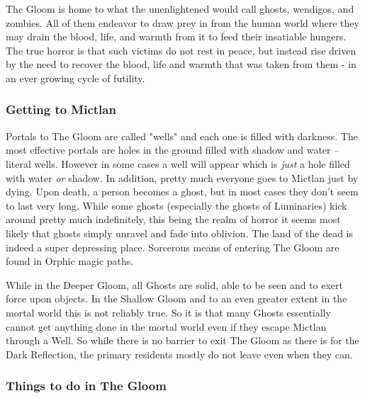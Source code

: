 The Gloom is home to what the unenlightened would call ghosts, wendigos, and zombies. All of them endeavor to draw prey in from the human world where they may drain the blood, life, and warmth from it to feed their insatiable hungers. The true horror is that such victims do not rest in peace, but instead rise driven by the need to recover the blood, life and warmth that was taken from them - in an ever growing cycle of futility. 

\subsubsection{Getting to Mictlan}

Portals to The Gloom are called "wells" and each one is filled with darkness. The most effective portals are holes in the ground filled with shadow and water -- literal wells. However in some cases a well will appear which is \textit{just} a hole filled with water \textit{or} shadow. In addition, pretty much everyone goes to Mictlan just by dying. Upon death, a person becomes a ghost, but in most cases they don't seem to last very long. While some ghosts (especially the ghosts of Luminaries) kick around pretty much indefinitely, this being the realm of horror it seems most likely that ghosts simply unravel and fade into oblivion. The land of the dead is indeed a super depressing place. Sorcerous means of entering The Gloom are found in Orphic magic paths.

While in the Deeper Gloom, all Ghosts are solid, able to be seen and to exert force upon objects. In the Shallow Gloom and to an even greater extent in the mortal world this is not reliably true. So it is that many Ghosts essentially cannot get anything done in the mortal world even if they escape Mictlan through a Well. So while there is no barrier to exit The Gloom as there is for the Dark Reflection, the primary residents mostly do not leave even when they can.

\subsubsection{Things to do in The Gloom}

